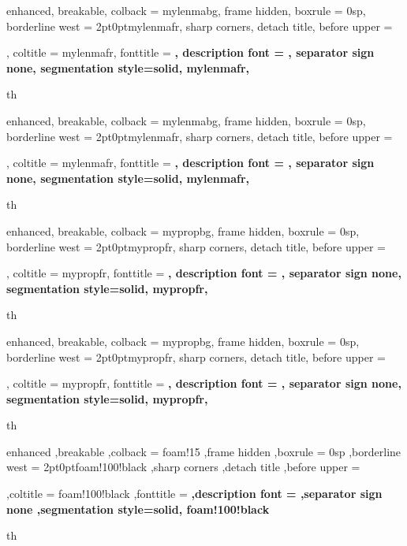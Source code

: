 {%
	enhanced,
	breakable,
	colback = mylenmabg,
	frame hidden,
	boxrule = 0sp,
	borderline west = {2pt}{0pt}{mylenmafr},
	sharp corners,
	detach title,
	before upper = \tcbtitle\par\smallskip,
	coltitle = mylenmafr,
	fonttitle = \bfseries\sffamily,
	description font = \mdseries,
	separator sign none,
	segmentation style={solid, mylenmafr},
}
{th}
{%
	enhanced,
	breakable,
	colback = mylenmabg,
	frame hidden,
	boxrule = 0sp,
	borderline west = {2pt}{0pt}{mylenmafr},
	sharp corners,
	detach title,
	before upper = \tcbtitle\par\smallskip,
	coltitle = mylenmafr,
	fonttitle = \bfseries\sffamily,
	description font = \mdseries,
	separator sign none,
	segmentation style={solid, mylenmafr},
}
{th}



{%
	enhanced,
	breakable,
	colback = mypropbg,
	frame hidden,
	boxrule = 0sp,
	borderline west = {2pt}{0pt}{mypropfr},
	sharp corners,
	detach title,
	before upper = \tcbtitle\par\smallskip,
	coltitle = mypropfr,
	fonttitle = \bfseries\sffamily,
	description font = \mdseries,
	separator sign none,
	segmentation style={solid, mypropfr},
}
{th}

{%
	enhanced,
	breakable,
	colback = mypropbg,
	frame hidden,
	boxrule = 0sp,
	borderline west = {2pt}{0pt}{mypropfr},
	sharp corners,
	detach title,
	before upper = \tcbtitle\par\smallskip,
	coltitle = mypropfr,
	fonttitle = \bfseries\sffamily,
	description font = \mdseries,
	separator sign none,
	segmentation style={solid, mypropfr},
}
{th}



{%
	enhanced
	,breakable
	,colback = foam!15
	,frame hidden
	,boxrule = 0sp
	,borderline west = {2pt}{0pt}{foam!100!black}
	,sharp corners
	,detach title
	,before upper = \tcbtitle\par\smallskip
	,coltitle = foam!100!black
	,fonttitle = \bfseries\sffamily
	,description font = \mdseries
	,separator sign none
	,segmentation style={solid, foam!100!black}
}
{th}



